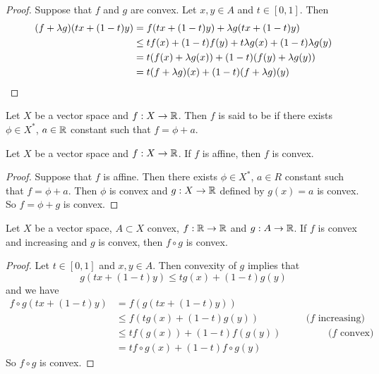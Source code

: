 \documentclass{book}
\begin{document}
	\begin{proof}
	Suppose that $f$ and $g$ are convex. Let $x,y \in A$ and $t \in [0,1]$. Then 
	\begin{align*}
	(f + \lambda g)(tx + (1-t)y) 
	&= f(tx + (1-t)y) + \lambda g(tx + (1-t)y) \\
	& \leq tf(x) + (1-t)f(y) +  t \lambda g(x) + (1-t)\lambda g(y) \\
	&= t(f(x) + \lambda g(x)) + (1-t)(f(y) + \lambda g(y))\\
	& = t(f + \lambda g)(x) + (1-t)(f + \lambda g)(y)
\end{align*}		 
	\end{proof}
	
	
	\begin{defn} 
	Let $X$ be a vector space and $f: X \rightarrow \mathbb{R}$. Then $f$ is said to be  if there exists $\phi \in X^*$, $a \in \mathbb{R}$ constant such that $f = \phi + a$.\\
	\end{defn}
	
	\begin{ex} 
	Let $X$ be a vector space and $f: X \rightarrow \mathbb{R}$. If $f$ is affine, then $f$ is convex.
	\end{ex}
	
	\begin{proof}
	Suppose that $f$ is affine. Then there exists $\phi \in X^*$, $a \in R$ constant such that $f = \phi + a$. Then $\phi$ is convex and $g: X \rightarrow \mathbb{R}$ defined by $g(x) = a$ is convex. So $f = \phi + g$ is convex.
	\end{proof}
	
	\begin{ex} 
	Let $X$ be a vector space, $A \subset X$ convex, $f:\mathbb{R} \rightarrow \mathbb{R}$ and $g: A \rightarrow \mathbb{R}$. If $f$ is convex and increasing and $g$ is convex, then $f \circ g$ is convex.
	\end{ex}	
	
	\begin{proof}
	Let $t \in [0,1]$ and $x, y \in A$. Then convexity of $g$ implies that $$g(tx +(1-t)y) \leq tg(x) + (1-t)g(y)$$ and we have
	\begin{align*}
	f\circ g(tx +(1-t)y) 
	&= f(g(tx +(1-t)y)) \\
	& \leq f(tg(x) + (1-t)g(y)) \hspace{2cm} (f \text{ increasing)}\\
	& \leq tf(g(x)) + (1-t)f(g(y)) \hspace{2cm}  (f \text{ convex)}\\	
	&= tf \circ g(x) + (1-t)f \circ g(y)
\end{align*}	 
So $f \circ g$ is convex.
	\end{proof}
	
\end{document}
